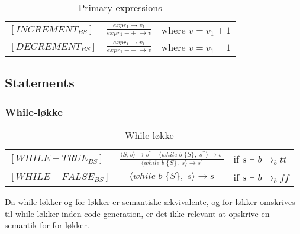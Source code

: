     \bgroup
    \def\arraystretch{3}
    \begin{table}[H]
    \centering
    \begin{tabular}{l c l}
        
        $[INCREMENT_{BS}]$ & $\frac{expr_1 \rightarrow v_1}{expr_1++\; \rightarrow v}$ & where $v = v_1 + 1$ \\
        
        $[DECREMENT_{BS}]$ &$\frac{expr_1 \rightarrow v_1}{expr_1- -\; \rightarrow v}$ & where $v = v_1 - 1$ \\
        
        
    \end{tabular}
    \caption{Primary expressions}
    \label{tab:primary}
    \end{table}
    \egroup


\noindent \subsection{Statements}

\noindent \subsubsection{While-løkke}

    \bgroup
    \def\arraystretch{3}
    \begin{table}[H]
    \centering
    \begin{tabular}{l c l}
        
        $[WHILE-TRUE_{BS}]$ & $
        \frac{\langle S, s\rangle  \rightarrow s^{\prime\prime} \quad \langle while\;b\;\{ S\},\;s^{\prime\prime}\rangle  \rightarrow s^{\prime}}
        {\langle while\;b\;\{ S\},\;s\rangle  \rightarrow s^{\prime}}
        $ & if $s \vdash b \rightarrow_b tt$ \\
        
        $[WHILE-FALSE_{BS}]$ & $
        \langle while\;b\;\{S\},\;s\rangle  \rightarrow s$ & 
        if $s \vdash b \rightarrow_b ff$ \\

    \end{tabular}
    \caption{While-løkke}
    \label{tab:while}
    \end{table}
    \egroup
    
Da while-løkker og for-løkker er semantiske ækvivalente, og for-løkker omskrives til while-løkker inden code generation, er det ikke relevant at opskrive en semantik for for-løkker.

